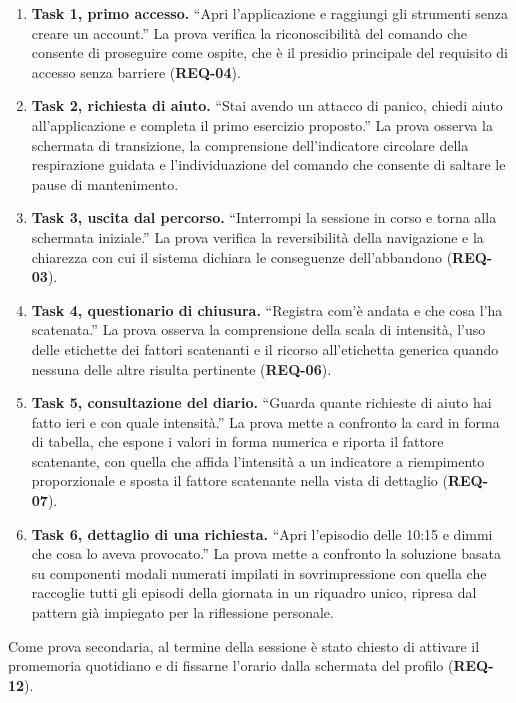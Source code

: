 \begin{enumerate}
    \item \textbf{Task 1, primo accesso.} \enquote{Apri l'applicazione e raggiungi gli strumenti senza creare un account.} La prova verifica la riconoscibilità del comando che consente di proseguire come ospite, che è il presidio principale del requisito di accesso senza barriere (\textbf{REQ-04}).
    \item \textbf{Task 2, richiesta di aiuto.} \enquote{Stai avendo un attacco di panico, chiedi aiuto all'applicazione e completa il primo esercizio proposto.} La prova osserva la schermata di transizione, la comprensione dell'indicatore circolare della respirazione guidata e l'individuazione del comando che consente di saltare le pause di mantenimento.
    \item \textbf{Task 3, uscita dal percorso.} \enquote{Interrompi la sessione in corso e torna alla schermata iniziale.} La prova verifica la reversibilità della navigazione e la chiarezza con cui il sistema dichiara le conseguenze dell'abbandono (\textbf{REQ-03}).
    \item \textbf{Task 4, questionario di chiusura.} \enquote{Registra com'è andata e che cosa l'ha scatenata.} La prova osserva la comprensione della scala di intensità, l'uso delle etichette dei fattori scatenanti e il ricorso all'etichetta generica quando nessuna delle altre risulta pertinente (\textbf{REQ-06}).
    \item \textbf{Task 5, consultazione del diario.} \enquote{Guarda quante richieste di aiuto hai fatto ieri e con quale intensità.} La prova mette a confronto la card in forma di tabella, che espone i valori in forma numerica e riporta il fattore scatenante, con quella che affida l'intensità a un indicatore a riempimento proporzionale e sposta il fattore scatenante nella vista di dettaglio (\textbf{REQ-07}).
    \item \textbf{Task 6, dettaglio di una richiesta.} \enquote{Apri l'episodio delle 10:15 e dimmi che cosa lo aveva provocato.} La prova mette a confronto la soluzione basata su componenti modali numerati impilati in sovrimpressione con quella che raccoglie tutti gli episodi della giornata in un riquadro unico, ripresa dal pattern già impiegato per la riflessione personale.
\end{enumerate}

Come prova secondaria, al termine della sessione è stato chiesto di attivare il promemoria quotidiano e di fissarne l'orario dalla schermata del profilo (\textbf{REQ-12}).

